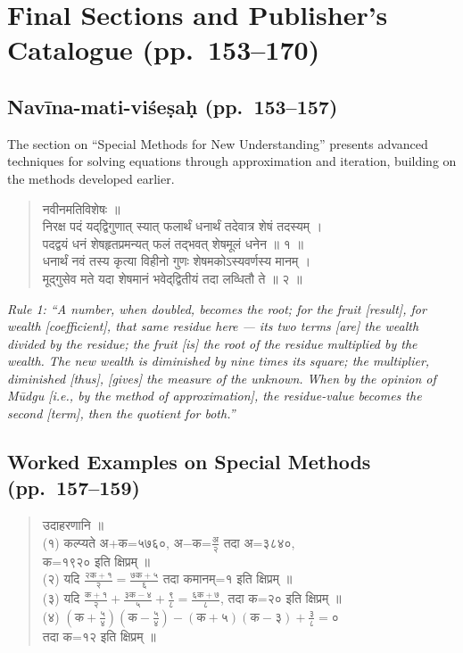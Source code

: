 \documentclass[11pt,a4paper]{article}
\newcommand{\cnote}[1]{\textcolor{notecolor}{\textit{#1}}}
\newcommand{\dev}[1]{{\devanagarifont #1}}
\newenvironment{sanskritverse}{%
  \begin{quote}
}{%
  \end{quote}
}
\begin{document}
\section{Final Sections and Publisher's Catalogue (pp.\ 153--170)}
\label{sec:final}

\subsection{Navīna-mati-viśeṣaḥ (pp.\ 153--157)}

The section on ``Special Methods for New Understanding'' presents advanced techniques for solving equations through approximation and iteration, building on the methods developed earlier.

\begin{sanskritverse}
\dev{%
नवीनमतिविशेषः ॥\\[0.5em]
निरक्ष पदं यद्‌द्विगुणात् स्यात् फलार्थं धनार्थं तदेवात्र शेषं तदस्यम् ।\\
पदद्वयं धनं शेषहृतप्रमन्यत् फलं तद्‌भवत् शेषमूलं धनेन ॥ १ ॥\\
धनार्थं नवं तस्य कृत्या विहीनो गुणः शेषमकोऽस्यवर्णस्य मानम् ।\\
मूद्‌गुसेव मते यदा शेषमानं भवेद्‌द्वितीयं तदा लव्धितौ ते ॥ २ ॥}
\end{sanskritverse}

\cnote{Rule 1: ``A number, when doubled, becomes the root; for the fruit [result], for wealth [coefficient], that same residue here --- its two terms [are] the wealth divided by the residue; the fruit [is] the root of the residue multiplied by the wealth. The new wealth is diminished by nine times its square; the multiplier, diminished [thus], [gives] the measure of the unknown. When by the opinion of Mūdgu [i.e., by the method of approximation], the residue-value becomes the second [term], then the quotient for both.''}

\subsection{Worked Examples on Special Methods (pp.\ 157--159)}

\begin{sanskritverse}
\dev{%
उदाहरणानि ॥\\[0.3em]
(१) कल्प्यते अ+क=५७६०, अ$-$क=$\frac{\text{अ}}{२}$ तदा अ=३८४०,\\
\hspace*{2em} क=१९२० इति क्षिप्रम् ॥\\[0.3em]
(२) यदि $\frac{२\text{क}+१}{२} = \frac{७\text{क}+५}{६}$ तदा कमानम्=१ इति क्षिप्रम् ॥\\[0.3em]
(३) यदि $\frac{\text{क}+१}{२} + \frac{३\text{क}-४}{५} + \frac{९}{८} = \frac{६\text{क}+७}{८}$, तदा क=२० इति क्षिप्रम् ॥\\[0.3em]
(४) $(\text{क}+\frac{५}{४})(\text{क}-\frac{५}{४}) - (\text{क}+५)(\text{क}-३) + \frac{३}{८} = ०$\\
\hspace*{2em} तदा क=१२ इति क्षिप्रम् ॥}
\end{sanskritverse}
\end{document}
